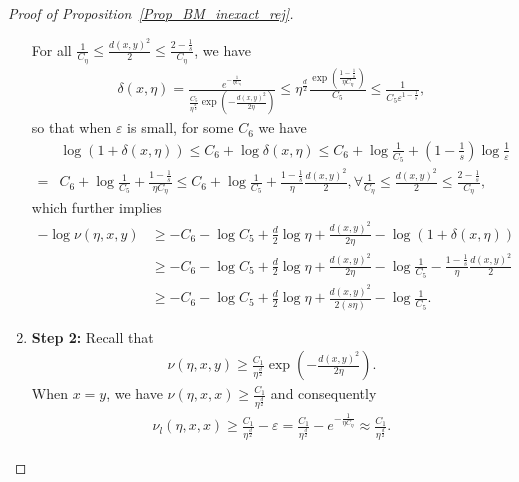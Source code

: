 \begin{proof}[Proof of Proposition~\ref{Prop_BM_inexact_rej}]
\begin{enumerate}
        For all $\frac{1}{C_{\eta}}\le \frac{d(x, y)^{2}}{2} \le \frac{2-\frac{1}{s}}{C_{\eta}}$, we have 
        \begin{align*}
            \delta(x, \eta) = \frac{e^{- \frac{1}{\eta C_{\eta}}}}{\frac{C_{5}}{\eta^{\frac{d}{2}}} \exp (-\frac{d(x, y)^{2}}{2\eta})}
            \le \eta^{\frac{d}{2}}\frac{ \exp (\frac{1- \frac{1}{s}}{\eta C_{\eta}})}{C_{5} }
            \le \frac{1}{C_{5}\varepsilon^{1-\frac{1}{s}} },
        \end{align*}
        so that when $\varepsilon$ is small, for some $C_{6}$ we have
        \begin{align*}
                &\log (1 + \delta(x, \eta)) 
            \le C_{6} + \log \delta(x, \eta)
            \le C_{6} + \log \frac{1}{C_{5}} + (1-\frac{1}{s})\log \frac{1}{\varepsilon} \\
            =& C_{6} + \log \frac{1}{C_{5}} + \frac{1-\frac{1}{s}}{\eta C_{\eta}}
            \le C_{6} + \log \frac{1}{C_{5}} + \frac{1-\frac{1}{s}}{\eta}\frac{d(x, y)^{2}}{2},
            \forall \frac{1}{C_{\eta}}\le \frac{d(x, y)^{2}}{2} \le \frac{2-\frac{1}{s}}{C_{\eta}},
        \end{align*}
        which further implies
        \begin{align*}
                - \log \nu(\eta, x, y) &\ge - C_{6} - \log C_{5} + \frac{d}{2}\log \eta + \frac{d(x, y)^{2}}{2\eta} - \log (1+\delta(x, \eta)) \\
                &\ge - C_{6} - \log C_{5} + \frac{d}{2}\log \eta + \frac{d(x, y)^{2}}{2\eta} - \log \frac{1}{C_{5}} - \frac{1-\frac{1}{s}}{\eta}\frac{d(x, y)^{2}}{2} \\
                &\ge - C_{6} - \log C_{5} + \frac{d}{2}\log \eta + \frac{d(x, y)^{2}}{2(s\eta)} - \log \frac{1}{C_{5}}.
        \end{align*} 

    \item \textbf{Step 2:} Recall that 
        \begin{align*}
            \nu(\eta, x, y) \ge \frac{C_{1}}{\eta^{\frac{d}{2}}} \exp(-\frac{d(x, y)^{2}}{2\eta}).
        \end{align*}
        When $x = y$, we have $\nu(\eta, x, x) \ge \frac{C_{1}}{\eta^{\frac{d}{2}}}$
        and consequently 
        \begin{align*}
            \nu_{l}(\eta, x, x) \ge \frac{C_{1}}{\eta^{\frac{d}{2}}} - \varepsilon 
            = \frac{C_{1}}{\eta^{\frac{d}{2}}} - e^{- \frac{1}{\eta C_{\eta}}}
            \approx \frac{C_{1}}{\eta^{\frac{d}{2}}}.
        \end{align*}


\end{enumerate}
\end{proof}
